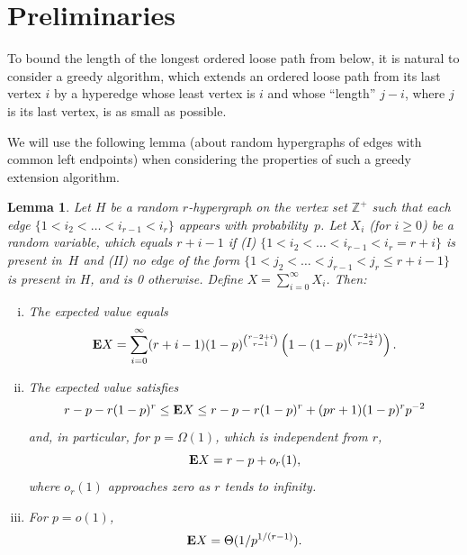 \documentclass[12pt,reqno]{amsart}
\newtheorem{lemma}[theorem]{Lemma}
\theoremstyle{remark}
\def\E{\mbox{{\bf E}}}
\def\E{\mbox{{\bf E}}}
\begin{document}
\section{Preliminaries}\label{pre}
To bound the length of the longest ordered loose path from below, it is natural to consider a greedy algorithm, which extends an ordered loose path from its last vertex $i$ by a hyperedge whose least vertex is $i$ and whose ``length'' $j-i$, where $j$ is its last vertex, is as small as possible.

We will use the following lemma (about random hypergraphs of edges with common left endpoints) when considering the properties of such a greedy extension algorithm.
\begin{lemma}\label{lem:geometric}
  Let $H$ be a random $r$-hypergraph on the vertex set $\mathbb{Z}^+$ such that each edge $\{1<i_2<\dots<i_{r-1}<i_{r}\}$ appears with probability~$p$. Let $X_i$ (for $i\ge 0$) be a random variable, which equals $r+i-1$ if (I) $\{1<i_2<\dots<i_{r-1} < i_r=r+i\}$ is present in~$H$ and (II) no edge of the form $\{1<j_2<\dots<j_{r-1}<j_r \leq r+i-1\}$ is present in $H$, {and is 0 otherwise}. Define $X=\sum_{i=0}^\infty X_i$. Then:
\begin{enumerate}[(i)]

\item\label{prop:geometric:i} The expected value equals
\[
\E X=\sum_{i=0}^\infty (r+i-1) (1-p)^{\binom{r-2+i}{r-1}} \left( 1-\left(1-p \right)^{\binom{r-2+i}{r-2}} \right).
\]

\item\label{prop:geometric:ii} The expected value satisfies
\[
r -p - r(1-p)^r \le \E X \le  r -p - r(1-p)^r+ (pr+1)(1-p)^rp^{-2}
\]
and, in particular, for $p=\Omega(1)$, which is independent from $r$,
\[
\E X = r-p+o_r(1),
\]
where $o_r(1)$ approaches zero as $r$ tends to infinity.

\item\label{prop:geometric:iii} For $p=o(1)$,
\[
\E X = \Theta(1/p^{1/(r-1)}).
\]
\end{enumerate}
\end{lemma}
\end{document}
